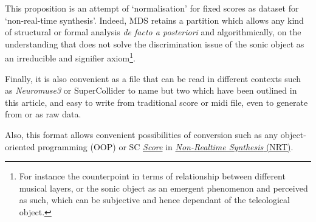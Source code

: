 This proposition is an attempt of `normalisation' for fixed scores as dataset for `non-real-time synthesis'. Indeed, MDS retains a partition which allows any kind of structural or formal analysis \textit{de facto a posteriori} and algorithmically, on the understanding that does not solve the discrimination issue of the sonic object as an irreducible and signifier axiom\footnote{For instance the counterpoint in terms of relationship between different musical layers, or the sonic object as an emergent phenomenon and perceived as such, which can be subjective and hence dependant of the teleological object.}. 

\bigskip 

Finally, it is also convenient as a file that can be read in different contexts such as  \textsl{Neuromuse3} or SuperCollider to name but two which have been outlined in this article, and easy to write from traditional score or midi file, even to generate from or as raw data.

Also, this format allows convenient possibilities of conversion such as any object-oriented programming (OOP) or SC \href{http://doc.sccode.org/Classes/Score.html}{\textit{Score}} in \href{http://doc.sccode.org/Guides/Non-Realtime-Synthesis.html}{\textit{Non-Realtime Synthesis} (NRT)}.





